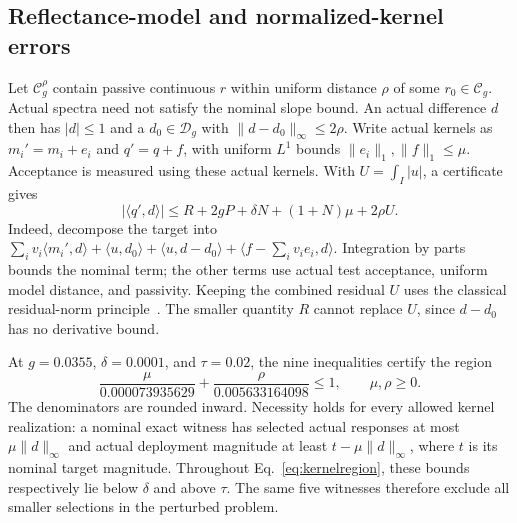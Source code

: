 \documentclass{optica-article}
\newcommand{\Cg}{\mathcal C_g}
\newcommand{\Dg}{\mathcal D_g}
\newcommand{\ip}[2]{\langle #1,#2\rangle}
\newcommand{\norm}[1]{\lVert#1\rVert}
\begin{document}
\subsection{Reflectance-model and normalized-kernel errors}
Let $\Cg^\rho$ contain passive continuous $r$ within uniform distance $\rho$ of some $r_0\in\Cg$. Actual spectra need not satisfy the nominal slope bound. An actual difference $d$ then has $|d|\leq1$ and a $d_0\in\Dg$ with $\norm{d-d_0}_\infty\leq2\rho$. Write actual kernels as $m_i'=m_i+e_i$ and $q'=q+f$, with uniform $L^1$ bounds $\norm{e_i}_1,\norm f_1\leq\mu$. Acceptance is measured using these actual kernels. With $U=\int_I|u|$, a certificate gives
\begin{equation}
 |\ip{q'}d|\leq R+2gP+\delta N+(1+N)\mu+2\rho U.        \label{eq:robust}
\end{equation}
Indeed, decompose the target into
$\sum_i v_i\ip{m_i'}d+\ip u{d_0}+\ip u{d-d_0}+\ip{f-\sum_i v_i e_i}d$.
Integration by parts bounds the nominal term; the other terms use actual test acceptance, uniform model distance, and passivity. Keeping the combined residual $U$ uses the classical residual-norm principle~\cite{foucart}. The smaller quantity $R$ cannot replace $U$, since $d-d_0$ has no derivative bound.

At $g=0.0355$, $\delta=0.0001$, and $\tau=0.02$, the nine inequalities certify the region
\begin{equation}
 \frac{\mu}{0.000073935629}+\frac{\rho}{0.005633164098}\leq1,
 \qquad\mu,\rho\geq0.                                 \label{eq:kernelregion}
\end{equation}
The denominators are rounded inward. Necessity holds for every allowed kernel realization: a nominal exact witness has selected actual responses at most $\mu\norm d_\infty$ and actual deployment magnitude at least $t-\mu\norm d_\infty$, where $t$ is its nominal target magnitude. Throughout Eq.~\eqref{eq:kernelregion}, these bounds respectively lie below $\delta$ and above $\tau$. The same five witnesses therefore exclude all smaller selections in the perturbed problem.
\end{document}
